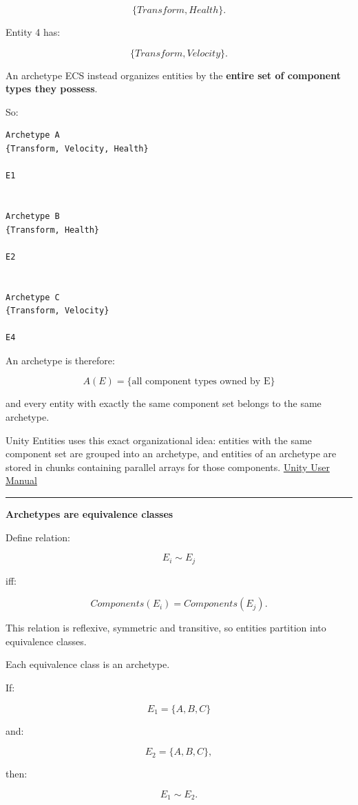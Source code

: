 \[
\{Transform,Health\}.
\]

Entity 4 has:

\[
\{Transform,Velocity\}.
\]

An archetype ECS instead organizes entities by the \textbf{entire set of component types they possess}.

So:

\begin{verbatim}
Archetype A
{Transform, Velocity, Health}

E1


Archetype B
{Transform, Health}

E2


Archetype C
{Transform, Velocity}

E4
\end{verbatim}

An archetype is therefore:

\[
\boxed{
A(E)=
\{\text{all component types owned by E}\}
}
\]

and every entity with exactly the same component set belongs to the same archetype.

Unity Entities uses this exact organizational idea: entities with the same component set are grouped into an archetype, and entities of an archetype are stored in chunks containing parallel arrays for those components. \href{https://docs.unity.cn/Packages/com.unity.entities\%401.0/manual/concepts-archetypes.html?utm_source=chatgpt.com}{Unity User Manual}

\begin{center}\rule{0.5\linewidth}{0.5pt}\end{center}

\textbf{Archetypes are equivalence classes}

Define relation:

\[
E_i\sim E_j
\]

iff:

\[
Components(E_i)=Components(E_j).
\]

This relation is reflexive, symmetric and transitive, so entities partition into equivalence classes.

Each equivalence class is an archetype.

If:

\[
E_1=\{A,B,C\}
\]

and:

\[
E_2=\{A,B,C\},
\]

then:

\[
E_1\sim E_2.
\]

